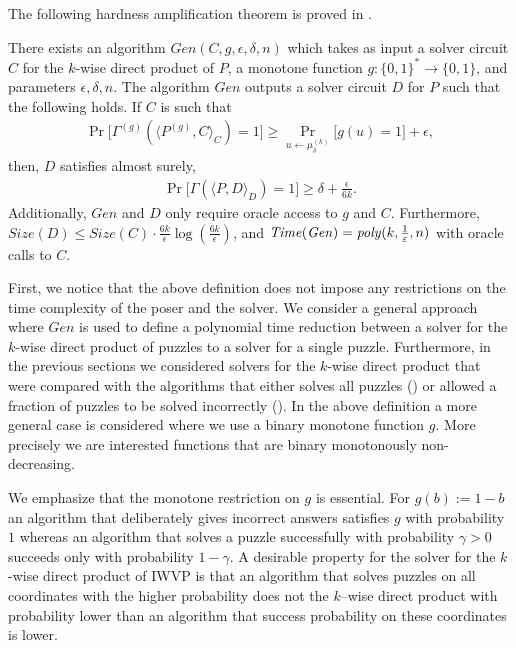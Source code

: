 The following hardness amplification theorem is proved in \cite{DBLP:journals/corr/abs-1002-3534}.
\begin{theorem}
There exists an algorithm $\mathit{Gen}(C,g,\epsilon, \delta, n)$ which takes as input a solver circuit $C$ for the $k$-wise
direct product of $P$, a monotone function $g: \{0,1\}^{*} \rightarrow \{0,1\}$, and parameters $\epsilon,\delta,n$.
The algorithm $\mathit{Gen}$ outputs a solver circuit $D$ for $P$ such that the following holds.
If $C$ is such that
\begin{align*}
\Pr\Big[\Gamma^{(g)}(\langle P^{(g)}, C \rangle_C) = 1\Big] \geq \Pr_{u \leftarrow \mu_{\delta}^{(k)}} \Big[ g(u) = 1 \Big] + \epsilon,
\end{align*}
then, $D$ satisfies almost surely,
\begin{align*}
  \Pr\Big[ \Gamma(\langle P, D\rangle_{D}) = 1\Big] \geq \delta + \frac{\epsilon}{6k}.
\end{align*}
Additionally, $\mathit{Gen}$ and $D$ only require oracle access to $g$ and $C$.
Furthermore, $\mathit{Size}(D) \leq \mathit{Size}(C) \cdot \frac{6k}{\epsilon} \log(\frac{6k}{\epsilon})$,
and $\operatorname{\mathit{Time}} (\mathit{Gen}) = \operatorname{\mathit{poly}}(k, \frac{1}{\varepsilon}, n)$ with oracle calls to $C$.
\end{theorem}

First, we notice that the above definition does not impose any restrictions on the time complexity of the poser and the solver.
We consider a general approach where $\mathit{Gen}$ is used to define a polynomial time reduction between a solver for the $k$-wise
direct product of puzzles to a solver for a single puzzle.
Furthermore, in the previous sections we considered solvers for the $k$-wise direct product that were compared with the algorithms that either
solves all puzzles (\cite{canetti2004hardness}) or allowed a fraction of puzzles to be solved incorrectly (\cite{Dodis:2009:SAI:1530441.1530450}).
In the above definition a more general case is considered where we use a binary monotone function $g$.
More precisely we are interested functions that are binary monotonously non-decreasing.

We emphasize that the monotone restriction on $g$ is essential. For $g(b) := 1 - b$ an algorithm that
deliberately gives incorrect answers satisfies $g$ with probability $1$ whereas an algorithm that solves a puzzle successfully with probability
$\gamma > 0$ succeeds only with probability $1 - \gamma$.
A desirable property for the solver for the $k$-wise direct product of IWVP is that
an algorithm that solves puzzles on all coordinates with the higher probability
does not the $k$--wise direct product with probability lower than an algorithm
that success probability on these coordinates is lower.

